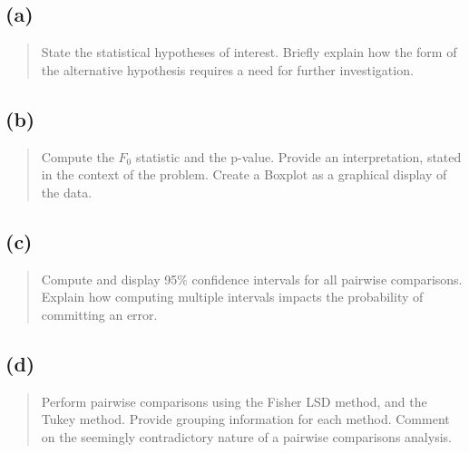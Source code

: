 \documentclass[
]{article}
\begin{document}
\hypertarget{a-1}{%
\subsection{(a)}\label{a-1}}

\begin{quote}
State the statistical hypotheses of interest. Briefly explain how the
form of the alternative hypothesis requires a need for further
investigation.
\end{quote}

\vspace{50pt}

\hypertarget{b-1}{%
\subsection{(b)}\label{b-1}}

\begin{quote}
Compute the \(F_0\) statistic and the p-value. Provide an
interpretation, stated in the context of the problem. Create a Boxplot
as a graphical display of the data.
\end{quote}

\vspace{50pt}

\hypertarget{c-1}{%
\subsection{(c)}\label{c-1}}

\begin{quote}
Compute and display 95\% confidence intervals for all pairwise
comparisons. Explain how computing multiple intervals impacts the
probability of committing an error.
\end{quote}

\vspace{50pt}

\hypertarget{d-1}{%
\subsection{(d)}\label{d-1}}

\begin{quote}
Perform pairwise comparisons using the Fisher LSD method, and the Tukey
method. Provide grouping information for each method. Comment on the
seemingly contradictory nature of a pairwise comparisons analysis.
\end{quote}

\vspace{50pt}
\end{document}
